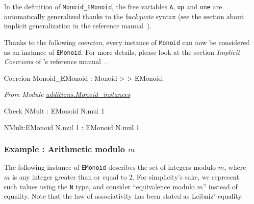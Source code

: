 \begin{remark}
In the definition of \texttt{Monoid\_EMonoid}, the free variables  \texttt{A}, 
\texttt{op} and \texttt{one} are automatically generalized thanks to the \emph{backquote} syntax (see the section about implicit generalization in the reference manual~\cite{Coq}).
\end{remark}

Thanks to the following \emph{coercion}, every instance of \texttt{Monoid} can 
now be considered as an instance of \texttt{EMonoid}. For more details, please look at the section \emph{Implicit Coercions} of \coq's reference manual~\cite{Coq}.






\begin{Coqsrc}
Coercion Monoid_EMonoid : Monoid >-> EMonoid.
\end{Coqsrc}


\emph{From Module \href{../theories/html/additions.Monoid_instances.html}{additions.Monoid\_instances}}

\begin{Coqsrc}
Check NMult : EMonoid  N.mul 1%
\end{Coqsrc}

\begin{Coqanswer}
  NMult:EMonoid N.mul 1%
     : EMonoid N.mul 1%
\end{Coqanswer}

\subsubsection{Example : Arithmetic  modulo $m$}

 
The following instance of \texttt{EMonoid} describes the set of integers modulo
$m$, where $m$ is any integer greater than or equal to $2$.
For simplicity's sake, we represent such values using the \texttt{N} type,
and consider ``equivalence modulo \texttt{$m$}'' instead of equality.
Note that the law of associativity has been stated as Leibniz' equality.


